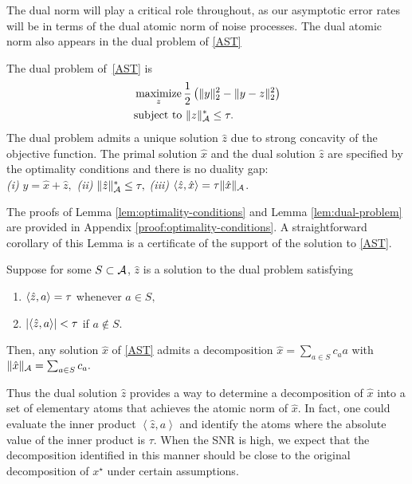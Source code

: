 The dual norm will play a critical role throughout, as our asymptotic error
rates will be in terms of the dual atomic norm of noise processes. The dual
atomic norm also appears in the dual problem of \eqref{AST} \begin{lemma} \label{lem:dual-problem} The dual problem of~\eqref{AST} is 
\begin{equation*} \label{eq:dual-ast} \begin{split} &\mathop{\operatorname{maximize}}_z
\frac{1}{2}\left(\lVert y\rVert_2^2 - \lVert y - z\rVert_2^2\right)\\ &\text{subject to }
\lVert z\rVert_{\mathcal{A}}^* \leq \tau. \end{split} \end{equation*} 
The dual problem admits a
unique solution $\hat{z}$ due to strong concavity of the objective function. The primal solution $\hat{x}$ and the dual solution
$\hat{z}$ are specified by the optimality conditions and there is no duality
gap:\\
\emph{(i)} $y = \hat{x} + \hat{z},$ 
\emph{(ii)} $\lVert\hat{z}\rVert_{\mathcal{A}}^* \leq \tau,$
\emph{(iii)} $\langle\hat{z}, \hat{x}\rangle = \tau
\lVert\hat{x}\rVert_{\mathcal{A}}$.  \
\end{lemma}

The proofs of Lemma \ref{lem:optimality-conditions} and Lemma
\ref{lem:dual-problem} are provided in Appendix
\ref{proof:optimality-conditions}. A straightforward corollary of this Lemma is
a certificate of the support of the solution to \eqref{AST}.

\begin{corollary}
\label{cor:dual-cert-support}

Suppose for some $S \subset \mathcal{A}$,  $\hat{z}$ is a solution to the dual problem  satisfying
\begin{enumerate}
\item $\langle\hat{z}, a\rangle = \tau$ whenever $a \in S,$
\item $|\langle\hat{z}, a\rangle| < \tau$ if $a \not\in S.$
\end{enumerate}
Then, any solution $\hat{x}$ of \eqref{AST} admits a decomposition $\hat{x} =
\sum_{a \in S}{c_a a}$ with $\lVert\hat{x}\rVert_{\mathcal{A}} = \sum_{a \in S}{c_a}.$

\end{corollary}

Thus the dual solution $\hat{z}$ provides a way to determine a
decomposition of $\hat{x}$ into a set of elementary atoms that achieves the
atomic norm of $\hat{x}$. In fact, one could evaluate the inner product
$\left<\hat{z}, a\right>$ and identify the atoms where the absolute value of the
inner product is $\tau$. When the SNR is high, we expect that the
decomposition identified in this manner should be close to the original
decomposition of $x^\star$ under certain assumptions.


